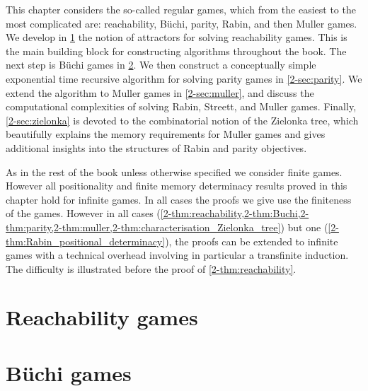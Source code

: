 

This chapter considers the so-called regular games, which from the easiest to the most complicated are: reachability, B{\"u}chi,
parity, Rabin, and then Muller games.
We develop in \cref{2-sec:attractors} the notion of attractors for solving reachability games. 
This is the main building block for constructing algorithms throughout the book.
The next step is B{\"u}chi games in \cref{2-sec:buchi}. 
We then construct a conceptually simple exponential time recursive algorithm for solving parity games in \cref{2-sec:parity}.
We extend the algorithm to Muller games in \cref{2-sec:muller}, and discuss the computational complexities of solving Rabin, Streett, and Muller games.
Finally, \cref{2-sec:zielonka} is devoted to the combinatorial notion of the Zielonka tree, 
which beautifully explains the memory requirements for Muller games and gives additional insights into the structures of Rabin and parity objectives.

\begin{remark}
\label{2-rmk:finite_vs_infinite}
As in the rest of the book unless otherwise specified we consider finite games.
However all positionality and finite memory determinacy results proved in this chapter hold for infinite games.
In all cases the proofs we give use the finiteness of the games.
However in all cases (\cref{2-thm:reachability,2-thm:Buchi,2-thm:parity,2-thm:muller,2-thm:characterisation_Zielonka_tree}) 
but one (\cref{2-thm:Rabin_positional_determinacy}),
the proofs can be extended to infinite games with a technical overhead involving in particular a transfinite induction.
The difficulty is illustrated before the proof of \cref{2-thm:reachability}.
\end{remark}


\section{Reachability games}
\label{2-sec:attractors}



\section{B{\"u}chi games}
\label{2-sec:buchi}


